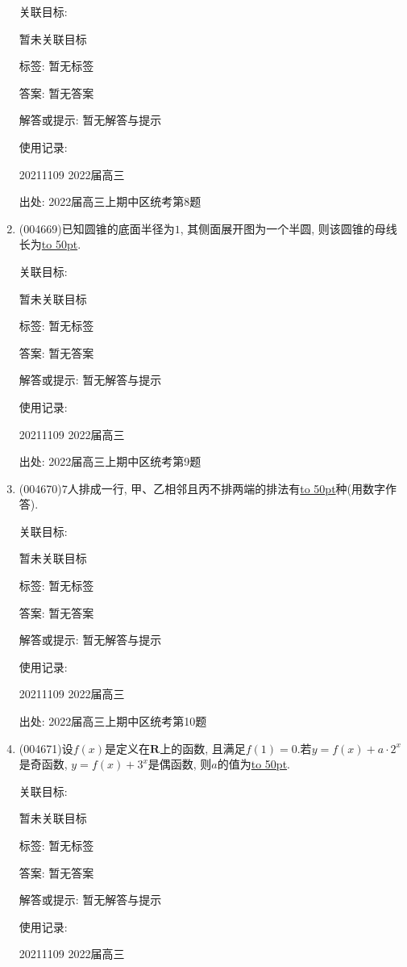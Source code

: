 \documentclass[10pt,a4paper]{article}
\newcommand{\blank}[1]{\underline{\hbox to #1pt{}}}
\begin{document}
\begin{enumerate}[1.]
关联目标:

暂未关联目标



标签: 暂无标签

答案: 暂无答案

解答或提示: 暂无解答与提示

使用记录:

20211109	2022届高三	


出处: 2022届高三上期中区统考第8题
\item { (004669)}已知圆锥的底面半径为$1$, 其侧面展开图为一个半圆, 则该圆锥的母线长为\blank{50}.


关联目标:

暂未关联目标



标签: 暂无标签

答案: 暂无答案

解答或提示: 暂无解答与提示

使用记录:

20211109	2022届高三	


出处: 2022届高三上期中区统考第9题
\item { (004670)}$7$人排成一行, 甲、乙相邻且丙不排两端的排法有\blank{50}种(用数字作答).


关联目标:

暂未关联目标



标签: 暂无标签

答案: 暂无答案

解答或提示: 暂无解答与提示

使用记录:

20211109	2022届高三	


出处: 2022届高三上期中区统考第10题
\item { (004671)}设$f(x)$是定义在$\mathbf{R}$上的函数, 且满足$f(1)=0$.若$y=f(x)+a\cdot 2^x$是奇函数, $y=f(x)+3^x$是偶函数, 则$a$的值为\blank{50}.


关联目标:

暂未关联目标



标签: 暂无标签

答案: 暂无答案

解答或提示: 暂无解答与提示

使用记录:

20211109	2022届高三	



\end{enumerate}
\end{document}
